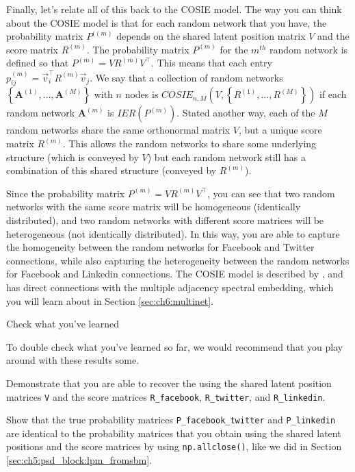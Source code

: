 Finally, let's relate all of this back to the COSIE model. The way you can think about the COSIE model is that for each random network that you have, the probability matrix $P^{((m)}$ depends on the shared latent position matrix $V$ and the score matrix $R^{(m)}$. The probability matrix $P^{(m)}$ for the $m^{th}$ random network is defined so that $P^{(m)} = VR^{(m)}V^\top$. This means that each entry $p_{ij}^{(m)} = \vec v_i^\top R^{(m)} \vec v_j$. We say that a collection of random networks $\left\{\mathbf A^{(1)}, ..., \mathbf A^{(M)}\right\}$ with $n$ nodes is $COSIE_{n,M}\left(V, \left\{R^{(1)},...,R^{(M)}\right\}\right)$ if each random network $\mathbf A^{(m)}$ is $IER(P^{(m)})$. Stated another way, each of the $M$ random networks share the same orthonormal matrix $V$, but a unique score matrix $R^{(m)}$. This allows the random networks to share some underlying structure (which is conveyed by $V$) but each random network still has a combination of this shared structure (conveyed by $R^{(m)}$). 

Since the probability matrix $P^{(m)} = VR^{(m)}V^\top$, you can see that two random networks with the same score matrix will be homogeneous (identically distributed), and two random networks with different score matrices will be heterogeneous (not identically distributed). In this way, you are able to capture the homogeneity between the random networks for Facebook and Twitter connections, while also capturing the heterogeneity between the random networks for Facebook and Linkedin connections. The COSIE model is described by \cite{Arroyo2021}, and has direct connections with the multiple adjacency spectral embedding, which you will learn about in Section \ref{sec:ch6:multinet}.

\begin{floatingbox}[h]\caption{Check what you've learned}
To double check what you've learned so far, we would recommend that you play around with these results some. 

Demonstrate that you are able to recover the using the shared latent position matrices \texttt{V} and the score matrices \texttt{R\_facebook}, \texttt{R\_twitter}, and \texttt{R\_linkedin}. 

Show that the true probability matrices \texttt{P\_facebook\_twitter} and \texttt{P\_linkedin} are identical to the probability matrices that you obtain using the shared latent positions and the score matrices by using \texttt{np.allclose()}, like we did in Section \ref{sec:ch5:psd_block:lpm_fromsbm}.
\end{floatingbox}

